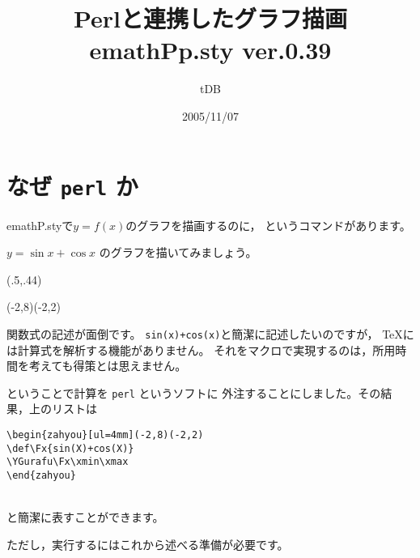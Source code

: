 \documentclass[a4j,fleqn]{jarticle}
\begin{document}
\title{\textsf{Perl}と連携したグラフ描画\\
emathPp.sty {\normalsize ver.0.39}}
\author{tDB}
\date{2005/11/07}

\maketitle\thispagestyle{empty}
\begin{abstract}%
\end{abstract}
\pagebreak
{}%

\tableofcontents

\pagebreak
{}

\section{なぜ \texttt{perl} か}
\textsf{emathP.sty}で$y=f(x)$のグラフを描画するのに，
というコマンドがあります。

$y=\sin x+\cos x$ のグラフを描いてみましょう。

\begin{showEx}(.5,.44){}
\begin{zahyou}[ul=4mm](-2,8)(-2,2)
\def\Fx#1#2{%
  \Sin{#1}\yi
  \Cos{#1}\yii
  \Add\yi\yii#2}
\yGurafu\Fx\xmin\xmax
\end{zahyou}
\end{showEx}

関数式の記述が面倒です。
\verb/sin(x)+cos(x)/と簡潔に記述したいのですが，
\TeX には計算式を解析する機能がありません。
それをマクロで実現するのは，所用時間を考えても得策とは思えません。

\noindent
ということで計算を \texttt{perl} というソフトに
外注することにしました。その結果，上のリストは
\begin{minipage}{.5\linewidth}
\begin{itembox}{}
\begin{verbatim}
\begin{zahyou}[ul=4mm](-2,8)(-2,2)
\def\Fx{sin(X)+cos(X)}
\YGurafu\Fx\xmin\xmax
\end{zahyou}
\end{verbatim}
\end{itembox}
\end{minipage}\\
と簡潔に表すことができます。

ただし，実行するにはこれから述べる準備が必要です。
\end{document}
